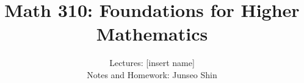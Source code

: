 \documentclass{article}
\author{Lectures: [insert name] \\ Notes and Homework: Junseo Shin}
\date{}
\title{Math 310: Foundations for Higher Mathematics}
\begin{document}
\maketitle
\tableofcontents
\pagebreak



\end{document}
